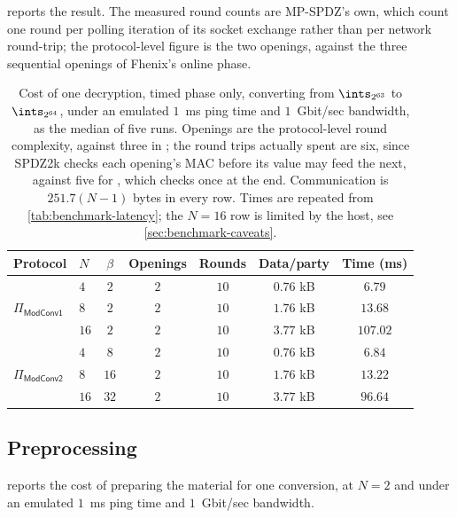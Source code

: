  reports the result.
The measured round counts are MP-SPDZ's own, which count one round per polling iteration of its socket exchange rather than per network round-trip; the protocol-level figure is the two openings, against the three sequential openings of Fhenix's online phase.

\begin{table}[tbp]
    \caption{%
        Cost of one decryption, timed phase only, converting from $\ints_{2^{63}}$ to $\ints_{2^{64}}$, under an emulated $1$~ms ping time and $1$~Gbit/sec bandwidth, as the median of five runs.
        Openings are the protocol-level round complexity, against three in \cite{CCS:ZZLP25}; the round trips actually spent are six, since SPDZ2k checks each opening's MAC before its value may feed the next, against five for \cite{CCS:ZZLP25}, which checks once at the end.
        Communication is $251.7(N-1)$ bytes in every row.
        Times are repeated from \cref{tab:benchmark-latency}; the $N = 16$ row is limited by the host, see \cref{sec:benchmark-caveats}.%
    }
    \label{tab:benchmark-online}
    \centering
    \small
    \setlength{\tabcolsep}{4pt}
    \begin{tabular}{@{}llccccc@{}}
        \toprule
        Protocol & $N$ & $\beta$ & Openings & Rounds & Data/party & Time (ms) \\
        \midrule
        \multirow{3}{*}{$\Pi_\mathsf{ModConv1}$}
            & $4$  & $2$ & $2$ & $10$ & $0.76$ kB & $6.79$ \\
            & $8$  & $2$ & $2$ & $10$ & $1.76$ kB & $13.68$ \\
            & $16$ & $2$ & $2$ & $10$ & $3.77$ kB & $107.02$ \\
        \midrule
        \multirow{3}{*}{$\Pi_\mathsf{ModConv2}$}
            & $4$  & $8$  & $2$ & $10$ & $0.76$ kB & $6.84$ \\
            & $8$  & $16$ & $2$ & $10$ & $1.76$ kB & $13.22$ \\
            & $16$ & $32$ & $2$ & $10$ & $3.77$ kB & $96.64$ \\
        \bottomrule
    \end{tabular}
\end{table}

\subsection{Preprocessing}
\label{sec:benchmark-preproc}

 reports the cost of preparing the material for one conversion, at $N = 2$ and under an emulated $1$~ms ping time and $1$~Gbit/sec bandwidth.

